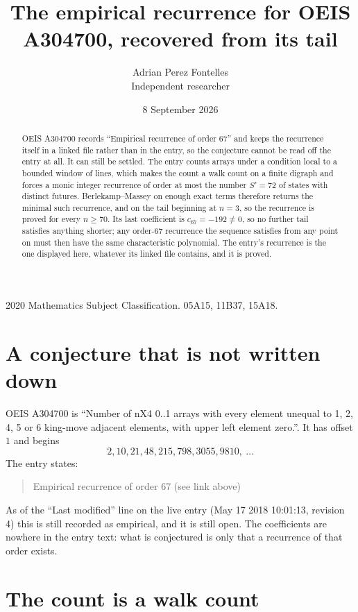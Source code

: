 \documentclass[11pt,a4paper]{article}
\title{The empirical recurrence for OEIS A304700, recovered from its tail}
\author{Adrian Perez Fontelles\\ \small Independent researcher}
\date{8 September 2026}
\theoremstyle{plain}
\theoremstyle{definition}
\begin{document}
\maketitle

\begin{abstract}
OEIS A304700 records ``Empirical recurrence of order $67$'' and keeps the recurrence itself in
a linked file rather than in the entry, so the conjecture cannot be read off the entry at all.
It can still be settled. The entry counts arrays under a condition local to a bounded window of
lines, which makes the count a walk count on a finite digraph and forces a monic integer
recurrence of order at most the number $S'=72$ of states with distinct futures. Berlekamp--Massey on
enough exact terms therefore returns the minimal such recurrence, and on the tail beginning at $n=3$, so the recurrence is proved for every $n\ge70$.
Its last coefficient is $c_{67}=-192\neq0$, so no further tail satisfies anything
shorter; any order-$67$ recurrence the sequence satisfies from any point on must then have
the same characteristic polynomial. The entry's recurrence is the one displayed here, whatever
its linked file contains, and it is proved.
\end{abstract}

\noindent\small 2020 Mathematics Subject Classification. 05A15, 11B37, 15A18.\normalsize

\section{A conjecture that is not written down}

OEIS A304700 is ``Number of nX4 0..1 arrays with every element unequal to 1, 2, 4, 5 or 6 king-move adjacent elements, with upper left element zero.''. It has offset $1$ and begins
\[
2, 10, 21, 48, 215, 798, 3055, 9810,\ \dots
\]
The entry states:
\begin{quote}
Empirical recurrence of order 67 (see link above)
\end{quote}
As of the ``Last modified'' line on the live entry (May 17 2018 10:01:13, revision 4)
this is still recorded as empirical, and it is still open. The coefficients are nowhere in the
entry text: what is conjectured is only that a recurrence of that order exists.

\section{The count is a walk count}
\end{document}
